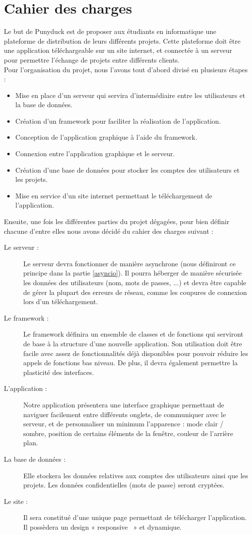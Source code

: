 \documentclass[twoside]{report}
\begin{document}
\section*{Cahier des charges}
Le but de Punyduck est de proposer aux étudiants en informatique une plateforme de distribution de leurs différents projets. Cette plateforme doit être une application téléchargeable sur un site internet, et connectée à un serveur pour permettre l'échange de projets entre différents clients. \\
Pour l'organisation du projet, nous l'avons tout d'abord divisé en plusieurs étapes : 
\begin{itemize}[label=$-$]
    \item Mise en place d’un serveur qui servira d’intermédiaire entre les utilisateurs et la base de données.
    \item Création d’un framework pour faciliter la réalisation de l’application.
    \item Conception de l’application graphique à l’aide du framework.
    \item Connexion entre l’application graphique et le serveur.
    \item Création d’une base de données pour stocker les comptes des utilisateurs et les
projets.
    \item Mise en service d’un site internet permettant le téléchargement de l’application.
\end{itemize}
Ensuite, une fois les différentes parties du projet dégagées, pour bien définir chacune d'entre elles nous avons décidé du cahier des charges suivant :
\begin{description}
    \item[Le serveur :] Le serveur devra fonctionner de manière asynchrone (nous définiront ce principe dans la partie \ref{asyncio}). Il pourra héberger de manière sécurisée les données des utilisateurs (nom, mots de passes, ...) et devra être capable de gérer la plupart des erreurs de réseau, comme les coupures de connexion lors d'un téléchargement.
    \item[Le framework :] Le framework définira un ensemble de classes et de fonctions qui serviront de base à la structure d'une nouvelle application. Son utilisation doit être facile avec assez de fonctionnalités déjà disponibles pour pouvoir réduire les appels de fonctions bas niveau. De plus, il devra également permettre la plasticité des interfaces.
    \item[L’application :] Notre application présentera une interface graphique permettant de naviguer facilement entre différents onglets, de communiquer avec le serveur, et de personnaliser un minimum l'apparence : mode clair / sombre, position de certains éléments de la fenêtre, couleur de l’arrière plan.
    \item[La base de données :] Elle stockera les données relatives aux comptes des utilisateurs ainsi que les projets. Les données confidentielles (mots de passe) seront cryptées.
    \item[Le site :] Il sera constitué d'une unique page permettant de télécharger l'application. Il possèdera un design « responsive~ » et dynamique.
\end{description}
\end{document}

